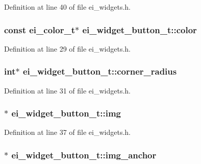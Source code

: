 Definition at line 40 of file ei\-\_\-widgets.\-h.

\hypertarget{structei__widget__button__t_aef37181d119084c4689f3925378f4be8}{
\subsubsection[{color}]{\setlength{\rightskip}{0pt plus 5cm}const {\bf ei\-\_\-color\-\_\-t}$\ast$ ei\-\_\-widget\-\_\-button\-\_\-t\-::color}}\label{structei__widget__button__t_aef37181d119084c4689f3925378f4be8}


Definition at line 29 of file ei\-\_\-widgets.\-h.

\hypertarget{structei__widget__button__t_ae15fd0035fd44f9a3341e15708b4649e}{
\subsubsection[{corner\-\_\-radius}]{\setlength{\rightskip}{0pt plus 5cm}int$\ast$ ei\-\_\-widget\-\_\-button\-\_\-t\-::corner\-\_\-radius}}\label{structei__widget__button__t_ae15fd0035fd44f9a3341e15708b4649e}


Definition at line 31 of file ei\-\_\-widgets.\-h.

\hypertarget{structei__widget__button__t_a0f160c882c948d59242d7db945ec51c2}{
\subsubsection[{img}]{$\ast$ ei\-\_\-widget\-\_\-button\-\_\-t\-::img}}\label{structei__widget__button__t_a0f160c882c948d59242d7db945ec51c2}


Definition at line 37 of file ei\-\_\-widgets.\-h.

\hypertarget{structei__widget__button__t_a885ab83105275752d79227abab3cde17}{
\subsubsection[{img\-\_\-anchor}]{$\ast$ ei\-\_\-widget\-\_\-button\-\_\-t\-::img\-\_\-anchor}}\label{structei__widget__button__t_a885ab83105275752d79227abab3cde17}


